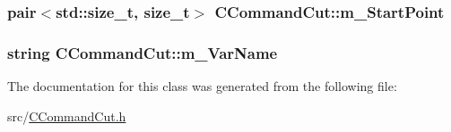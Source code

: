 \subsubsection[{\texorpdfstring{m\+\_\+\+Start\+Point}{m_StartPoint}}]{\setlength{\rightskip}{0pt plus 5cm}pair$<$std\+::size\+\_\+t, size\+\_\+t$>$ C\+Command\+Cut\+::m\+\_\+\+Start\+Point\hspace{0.3cm}{\ttfamily [protected]}}\hypertarget{classCCommandCut_adbd994d2b9e2620042427235516b446b}{}\label{classCCommandCut_adbd994d2b9e2620042427235516b446b}
\subsubsection[{\texorpdfstring{m\+\_\+\+Var\+Name}{m_VarName}}]{\setlength{\rightskip}{0pt plus 5cm}string C\+Command\+Cut\+::m\+\_\+\+Var\+Name\hspace{0.3cm}{\ttfamily [protected]}}\hypertarget{classCCommandCut_aeb69b9b4f3e1c319de83c2753294e2db}{}\label{classCCommandCut_aeb69b9b4f3e1c319de83c2753294e2db}


The documentation for this class was generated from the following file\+:\begin{DoxyCompactItemize}
\item 
src/\hyperlink{CCommandCut_8h}{C\+Command\+Cut.\+h}\end{DoxyCompactItemize}
